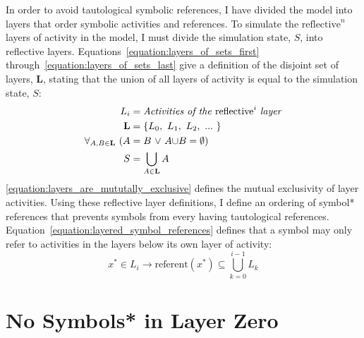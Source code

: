 In order to avoid tautological symbolic references, I have divided the
model into layers that order symbolic activities and references.  To
simulate the $\text{reflective}^n$ layers of activity in the model, I
must divide the simulation state, $S$, into reflective layers.
Equations~\ref{equation:layers_of_sets_first}
through~\ref{equation:layers_of_sets_last} give a definition of the
disjoint set of layers, $\mathbf{L}$, stating that the union of all
layers of activity is equal to the simulation state, $S$:
\begin{align}
\label{equation:layers_of_sets_first}
                            L_i &= \text{\emph{Activities of the} }\text{reflective}^i\text{ \emph{layer}} \\
                     \mathbf{L} &= \{L_0, ~L_1, ~L_2, ~...~ \} \\
\label{equation:layers_are_mututally_exclusive}
\forall_{A,B{\in}{\mathbf{L}}} ~ (A &= B ~{\vee}~ A{\cup}B = {\emptyset}) \\
\label{equation:layers_of_sets_last}
                      S &= \bigcup_{A{\in}\mathbf{L}}{A}
\end{align}
{\mbox{\autoref{equation:layers_are_mututally_exclusive}}} defines the
mutual exclusivity of layer activities.  Using these reflective layer
definitions, I define an ordering of symbol* references that prevents
symbols from every having tautological references.
Equation~\ref{equation:layered_symbol_references} defines that a
symbol may only refer to activities in the layers below its own layer
of activity:
\begin{equation}
\label{equation:layered_symbol_references}
x^* \in L_i \rightarrow \text{referent}(x^*) \subseteq \bigcup_{k=0}^{i-1}{L_k}
\end{equation}

\section{No Symbols* in Layer Zero}

